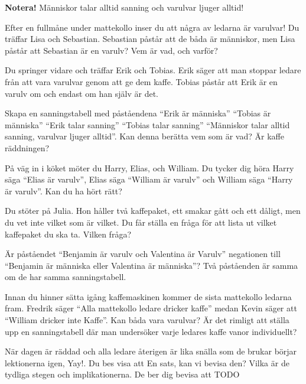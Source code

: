 \noindent
\textbf{Notera!}  Människor talar alltid sanning och varulvar ljuger alltid!

\begin{problem}
	Efter en fullmåne under mattekollo inser du att några av ledarna är varulvar! Du träffar Lisa och Sebastian. Sebastian påstår att de båda är människor, men Lisa påstår att Sebastian är en varulv? Vem är vad, och varför?
\end{problem}

\begin{problem}
	Du springer vidare och träffar Erik och Tobias. Erik säger att man stoppar ledare från att vara varulvar genom att ge dem kaffe. Tobias påstår att Erik är en varulv om och endast om han själv är det.

	Skapa en sanningstabell med påståendena ``Erik är människa'' ``Tobias är människa'' ``Erik talar sanning'' ``Tobias talar sanning'' ``Människor talar alltid sanning, varulvar ljuger alltid''. Kan denna berätta vem som är vad? Är kaffe räddningen?
\end{problem}

\begin{problem}
	På väg in i köket möter du Harry, Elias, och William. Du tycker dig höra Harry säga ``Elias är varulv'', Elias säga ``William är varulv'' och William säga ``Harry är varulv''. Kan du ha hört rätt?
\end{problem}

\begin{problem}[Extra]
	Du stöter på Julia. Hon håller två kaffepaket, ett smakar gått och ett dåligt, men du vet inte vilket som är vilket. Du får ställa en fråga för att lista ut vilket kaffepaket du ska ta. Vilken fråga?
\end{problem}

\begin{problem}
	Är påståendet ``Benjamin är varulv och Valentina är Varulv'' negationen till ``Benjamin är människa eller Valentina är människa''? Två påståenden är samma om de har samma sanningstabell.
\end{problem}

\begin{problem}
	Innan du hinner sätta igång kaffemaskinen kommer de sista mattekollo ledarna fram. Fredrik säger ``Alla mattekollo ledare dricker kaffe'' medan Kevin säger att ``William dricker inte Kaffe''. Kan båda vara varulvar? Är det rimligt att ställa upp en sanningstabell där man undersöker varje ledares kaffe vanor individuellt?
\end{problem}

\begin{problem}[Extra]
	När dagen är räddad och alla ledare återigen är lika snälla som de brukar börjar lektionerna igen, Yay!. Du bes visa att
	En sats, kan vi bevisa den? Vilka är de tydliga stegen och implikationerna.
	De ber dig bevisa att TODO
\end{problem}

